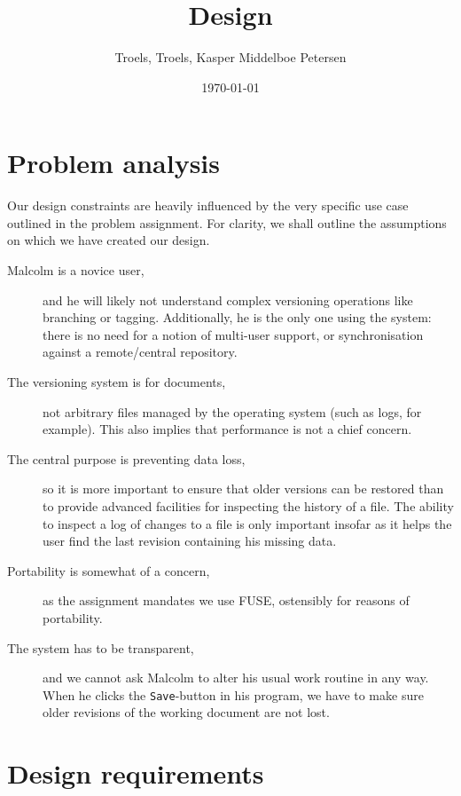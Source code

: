 \documentclass[12pt]{article}
\author{
        Troels, Troels, Kasper Middelboe Petersen
}
\date{\today}
\title{Design}
\begin{document}
 
\maketitle

\section{Problem analysis}

Our design constraints are heavily influenced by the very specific use
case outlined in the problem assignment.  For clarity, we shall
outline the assumptions on which we have created our design.

\begin{description}
\item[Malcolm is a novice user,] and he will likely not understand
  complex versioning operations like branching or tagging.
  Additionally, he is the only one using the system: there is no need
  for a notion of multi-user support, or synchronisation against a
  remote/central repository.
\item[The versioning system is for documents,] not arbitrary files
  managed by the operating system (such as logs, for example).  This
  also implies that performance is not a chief concern.
\item[The central purpose is preventing data loss,] so it is more
  important to ensure that older versions can be restored than to
  provide advanced facilities for inspecting the history of a file.
  The ability to inspect a log of changes to a file is only important
  insofar as it helps the user find the last revision containing his
  missing data.
\item[Portability is somewhat of a concern,] as the assignment
  mandates we use FUSE, ostensibly for reasons of portability.
\item[The system has to be transparent,] and we cannot ask Malcolm to
  alter his usual work routine in any way.  When he clicks the
  \texttt{Save}-button in his program, we have to make sure older
  revisions of the working document are not lost.
\end{description}

\section{Design requirements}
\end{document}
